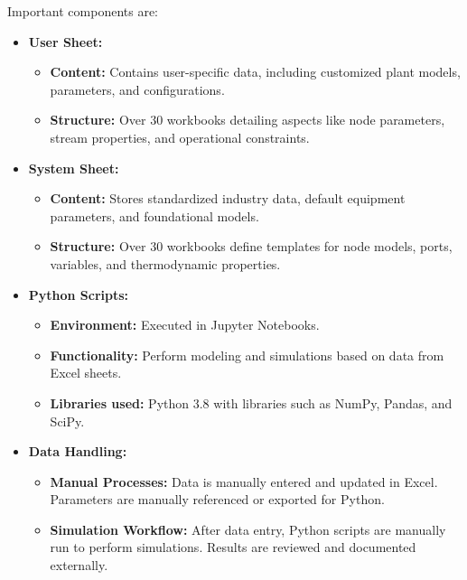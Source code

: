 \documentclass[12pt]{article}
\begin{document}
Important components are:
\begin{itemize}
    \item \textbf{User Sheet:}
    \begin{itemize}
        \item \textbf{Content:} Contains user-specific data, including customized plant models, parameters, and configurations.
        \item \textbf{Structure:} Over 30 workbooks detailing aspects like node parameters, stream properties, and operational constraints.
    \end{itemize}
    
    \item \textbf{System Sheet:}
    \begin{itemize}
        \item \textbf{Content:} Stores standardized industry data, default equipment parameters, and foundational models.
        \item \textbf{Structure:} Over 30 workbooks define templates for node models, ports, variables, and thermodynamic properties.
    \end{itemize}
    
    \item \textbf{Python Scripts:}
    \begin{itemize}
        \item \textbf{Environment:} Executed in Jupyter Notebooks.
        \item \textbf{Functionality:} Perform modeling and simulations based on data from Excel sheets.
        \item \textbf{Libraries used:} Python 3.8 with libraries such as NumPy, Pandas, and SciPy.
    \end{itemize}
    
    \item \textbf{Data Handling:}
    \begin{itemize}
        \item \textbf{Manual Processes:} Data is manually entered and updated in Excel. Parameters are manually referenced or exported for Python.
        \item \textbf{Simulation Workflow:} After data entry, Python scripts are manually run to perform simulations. Results are reviewed and documented externally.
    \end{itemize}

    
\end{itemize}
\end{document}
